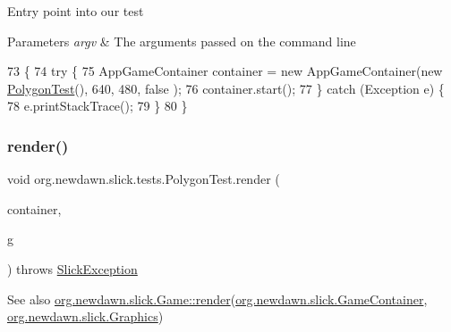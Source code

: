 Entry point into our test


\begin{DoxyParams}{Parameters}
{\em argv} & The arguments passed on the command line \\
\hline
\end{DoxyParams}

\begin{DoxyCode}
73                                            \{
74         \textcolor{keywordflow}{try} \{
75             AppGameContainer container = \textcolor{keyword}{new} AppGameContainer(\textcolor{keyword}{new} \mbox{\hyperlink{classorg_1_1newdawn_1_1slick_1_1tests_1_1_polygon_test_ac067fe625dbe2ba4c96e8cb7d94252ca}{PolygonTest}}(), 640, 480, \textcolor{keyword}{false}
      );
76             container.start();
77         \} \textcolor{keywordflow}{catch} (Exception e) \{
78             e.printStackTrace();
79         \}
80     \}
\end{DoxyCode}
\mbox{\label{classorg_1_1newdawn_1_1slick_1_1tests_1_1_polygon_test_a2db8017248967b5312c24a086a1543ec}} 
\subsubsection{\texorpdfstring{render()}{render()}}
{\footnotesize\ttfamily void org.\+newdawn.\+slick.\+tests.\+Polygon\+Test.\+render (\begin{DoxyParamCaption}\item[{\mbox{\hyperlink{classorg_1_1newdawn_1_1slick_1_1_game_container}{Game\+Container}}}]{container,  }\item[{\mbox{\hyperlink{classorg_1_1newdawn_1_1slick_1_1_graphics}{Graphics}}}]{g }\end{DoxyParamCaption}) throws \mbox{\hyperlink{classorg_1_1newdawn_1_1slick_1_1_slick_exception}{Slick\+Exception}}\hspace{0.3cm}{\ttfamily [inline]}}

\begin{DoxySeeAlso}{See also}
\mbox{\hyperlink{interfaceorg_1_1newdawn_1_1slick_1_1_game_af1a4670d43eb3ba04dfcf55ab1975b64}{org.\+newdawn.\+slick.\+Game\+::render}}(\mbox{\hyperlink{classorg_1_1newdawn_1_1slick_1_1_game_container}{org.\+newdawn.\+slick.\+Game\+Container}}, \mbox{\hyperlink{classorg_1_1newdawn_1_1slick_1_1_graphics}{org.\+newdawn.\+slick.\+Graphics}}) 
\end{DoxySeeAlso}


